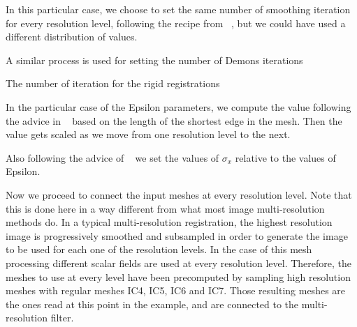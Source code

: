 \documentclass{InsightArticle}
\begin{document}
\begin{center}

\end{center}

In this particular case, we choose to set the same number of smoothing
iteration for every resolution level, following the recipe from
~\cite{Yeo2009}, but we could have used a different distribution of values.

A similar process is used for setting the number of Demons iterations

\begin{center}

\end{center}

The number of iteration for the rigid registrations

\begin{center}

\end{center}

In the particular case of the Epsilon parameters, we compute the value
following the advice in ~\cite{Yeo2009} based on the length of the shortest
edge in the mesh. Then the value gets scaled as we move from one resolution
level to the next.

\begin{center}

\end{center}

Also following the advice of ~\cite{Yeo2009} we set the values of $\sigma_x$
relative to the values of Epsilon.

\begin{center}

\end{center}

Now we proceed to connect the input meshes at every resolution level. Note that
this is done here in a way different from what most image multi-resolution
methods do. In a typical multi-resolution registration, the highest resolution
image is progressively smoothed and subsampled in order to generate the image
to be used for each one of the resolution levels. In the case of this mesh
processing different scalar fields are used at every resolution level.
Therefore, the meshes to use at every level have been precomputed by sampling
high resolution meshes with regular meshes IC4, IC5, IC6 and IC7. Those
resulting meshes are the ones read at this point in the example, and are
connected to the multi-resolution filter.
\end{document}
